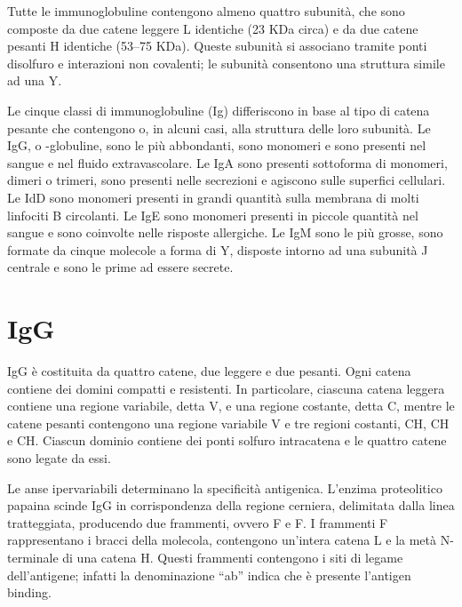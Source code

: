Tutte le immunoglobuline contengono almeno quattro subunità, che sono composte da due catene leggere L identiche (23 KDa circa) e da due catene pesanti H identiche (53--75 KDa). Queste subunità si associano tramite ponti disolfuro e interazioni non covalenti; le subunità consentono una struttura simile ad una Y.

Le cinque classi di immunoglobuline (Ig) differiscono in base al tipo di catena pesante che contengono o, in alcuni casi, alla struttura delle loro subunità. Le IgG, o \gamma-globuline, sono le più abbondanti, sono monomeri e sono presenti nel sangue e nel fluido extravascolare. Le IgA sono presenti sottoforma di monomeri, dimeri o trimeri, sono presenti nelle secrezioni e agiscono sulle superfici cellulari. Le IdD sono monomeri presenti in grandi quantità sulla membrana di molti linfociti B circolanti. Le IgE sono monomeri presenti in piccole quantità nel sangue e sono coinvolte nelle risposte allergiche. Le IgM sono le più grosse, sono formate da cinque molecole a forma di Y, disposte intorno ad una subunità J centrale e sono le prime ad essere secrete.

\section{IgG}


IgG è costituita da quattro catene, due leggere e due pesanti. Ogni catena contiene dei domini compatti e resistenti. In particolare, ciascuna catena leggera contiene una regione variabile, detta V, e una regione costante, detta C, mentre le catene pesanti contengono una regione variabile V e tre regioni costanti, CH, CH e CH. Ciascun dominio contiene dei ponti solfuro intracatena e le quattro catene sono legate da essi.

Le anse ipervariabili determinano la specificità antigenica. L'enzima proteolitico papaina scinde IgG in corrispondenza della regione cerniera, delimitata dalla linea tratteggiata, producendo due frammenti, ovvero F e F. I frammenti F rappresentano i bracci della molecola, contengono un'intera catena L e la metà N-terminale di una catena H.
Questi frammenti contengono i siti di legame dell'antigene; infatti la denominazione ``ab'' indica che è presente l'antigen binding.


